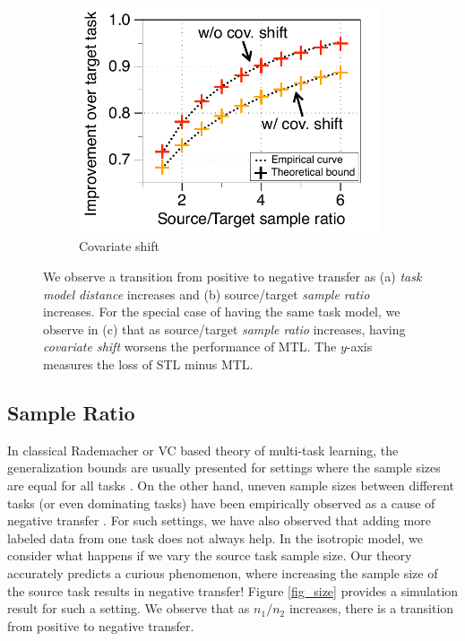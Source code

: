 \begin{figure}[!t]
\begin{subfigure}[b]{0.32\textwidth}
		\includegraphics[width=0.98\textwidth]{figures/complementary.pdf}
		\caption{Covariate shift}
		\label{fig_covariate}
	\end{subfigure}
	\caption{%
	We observe a transition from positive to negative transfer as (a) \textit{task model distance} increases and (b) source/target \textit{sample ratio} increases.
	For the special case of having the same task model, we observe in (c) that as source/target \textit{sample ratio} increases, having \textit{covariate shift} worsens the performance of MTL.
	The $y$-axis measures the loss of STL minus MTL.}
	\label{fig_model_shift_phasetrans}
\end{figure}

\subsection{Sample Ratio}\label{sec_data_size}

In classical Rademacher or VC based theory of multi-task learning, the generalization bounds are usually presented for settings where the sample sizes are equal for all tasks \cite{B00,M06,MPR16}.
On the other hand, uneven sample sizes between different tasks (or even dominating tasks) have been empirically observed as a cause of negative transfer \cite{YKGLHF20}.
For such settings, we have also observed that adding more labeled data from one task does not always help.
In the isotropic model, we consider what happens if we vary the source task sample size.
Our theory accurately predicts a curious phenomenon, where increasing the sample size of the source task results in negative transfer!
Figure \ref{fig_size} provides a simulation result for such a setting.
We observe that as $n_1 / n_2$ increases, there is a transition from positive to negative transfer.

